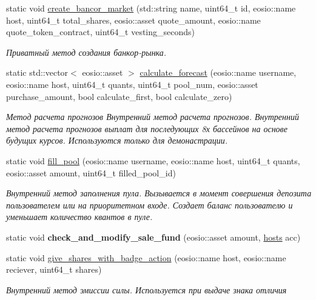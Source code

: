 \begin{DoxyCompactItemize}
static void \mbox{\hyperlink{classunicore_a0ea88fc9a5ee27ea75a85e6b842aeba6}{create\+\_\+bancor\+\_\+market}} (std\+::string name, uint64\+\_\+t id, eosio\+::name host, uint64\+\_\+t total\+\_\+shares, eosio\+::asset quote\+\_\+amount, eosio\+::name quote\+\_\+token\+\_\+contract, uint64\+\_\+t vesting\+\_\+seconds)
\begin{DoxyCompactList}\small\item\em Приватный метод создания банкор-\/рынка. \end{DoxyCompactList}\item 
static std\+::vector$<$ eosio\+::asset $>$ \mbox{\hyperlink{classunicore_af3856ac90d470eddfd5dec3f29cb0dc7}{calculate\+\_\+forecast}} (eosio\+::name username, eosio\+::name host, uint64\+\_\+t quants, uint64\+\_\+t pool\+\_\+num, eosio\+::asset purchase\+\_\+amount, bool calculate\+\_\+first, bool calculate\+\_\+zero)
\begin{DoxyCompactList}\small\item\em Метод расчета прогнозов Внутренний метод расчета прогнозов. Внутренний метод расчета прогнозов выплат для последующих 8х бассейнов на основе будущих курсов. Используются только для демонастрации. \end{DoxyCompactList}\item 
static void \mbox{\hyperlink{classunicore_a415141b20af92120acd7a752d646b1fa}{fill\+\_\+pool}} (eosio\+::name username, eosio\+::name host, uint64\+\_\+t quants, eosio\+::asset amount, uint64\+\_\+t filled\+\_\+pool\+\_\+id)
\begin{DoxyCompactList}\small\item\em Внутренний метод заполнения пула. Вызывается в момент совершения депозита пользователем или на приоритетном входе. Создает баланс пользователю и уменьшает количество квантов в пуле. \end{DoxyCompactList}\item 
\mbox{\label{classunicore_a5801b4011531f5cc142fd1cf28d6b6be}} 
static void {\bfseries check\+\_\+and\+\_\+modify\+\_\+sale\+\_\+fund} (eosio\+::asset amount, \mbox{\hyperlink{structhosts}{hosts}} acc)
\item 
static void \mbox{\hyperlink{classunicore_a21ad2432a12016b8907d553fc3c02cc4}{give\+\_\+shares\+\_\+with\+\_\+badge\+\_\+action}} (eosio\+::name host, eosio\+::name reciever, uint64\+\_\+t shares)
\begin{DoxyCompactList}\small\item\em Внутренний метод эмиссии силы. Используется при выдаче знака отличия \end{DoxyCompactList}\item 

\end{DoxyCompactItemize}
